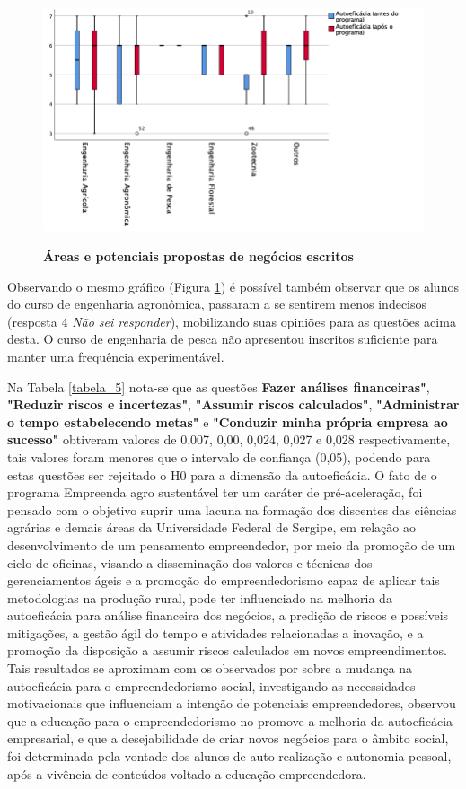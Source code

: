 \begin{figure}[H]
\centering
\caption{\textbf{Áreas e potenciais propostas de negócios escritos}}
\includegraphics[scale=0.5]{Imagens/boxplot_autoeficacia.png}
\label{figura_34}
\end{figure}


Observando o mesmo gráfico (Figura \ref{figura_34}) é possível também observar que os alunos do curso de engenharia agronômica, passaram a se sentirem menos indecisos (resposta 4 \textit{Não sei responder}), mobilizando suas opiniões para as questões acima desta. O curso de engenharia de pesca não apresentou inscritos suficiente para manter uma frequência experimentável. 


Na Tabela \ref{tabela_5} nota-se que as questões \textbf{Fazer análises financeiras"}, \textbf{"Reduzir riscos e incertezas"}, \textbf{"Assumir riscos calculados"}, \textbf{"Administrar o tempo estabelecendo metas"} e \textbf{"Conduzir minha própria empresa ao sucesso"} obtiveram valores de 0,007, 0,00, 0,024, 0,027 e 0,028 respectivamente, tais valores foram menores que o intervalo de confiança (0,05), podendo para estas questões ser rejeitado o H0 para a dimensão da autoeficácia. O fato de o programa Empreenda agro sustentável ter um caráter de pré-aceleração, foi pensado com o objetivo suprir uma lacuna na formação dos discentes das ciências agrárias e demais áreas da Universidade Federal de Sergipe, em relação ao desenvolvimento de um pensamento empreendedor, por meio da promoção de um ciclo de oficinas, visando a disseminação dos valores e técnicas dos gerenciamentos ágeis e a promoção do empreendedorismo capaz de aplicar tais metodologias na produção rural, pode ter influenciado na melhoria da autoeficácia para análise financeira dos negócios, a predição de riscos e possíveis mitigações, a gestão ágil do tempo e atividades relacionadas a inovação, e a promoção da disposição a assumir riscos calculados em novos empreendimentos. Tais resultados se aproximam com os observados por  sobre a mudança na autoeficácia para o empreendedorismo social, investigando as necessidades motivacionais que influenciam a intenção de potenciais empreendedores, observou que a educação para o empreendedorismo no promove a melhoria da autoeficácia empresarial, e que a desejabilidade de criar novos negócios para o âmbito social, foi determinada pela vontade dos alunos de auto realização e autonomia pessoal, após a vivência de conteúdos voltado a educação empreendedora. 



